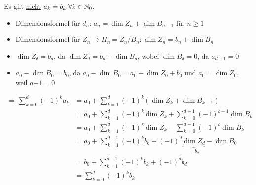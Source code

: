 \begin{bemerkung}
    Es gilt \underline{nicht} $a_k = b_k\;\forall k \in \mathbb{N}_0$.
\end{bemerkung}

\begin{beweis}\leavevmode
    \begin{itemize}
        \item Dimensionsformel für $d_n$: $a_n = \dim Z_n + \dim B_{n-1}$ für $n \geq 1$
        \item Dimensionsformel für $Z_n \rightarrow H_n = Z_n / B_n: \dim Z_n = b_n + \dim B_n$
        \item $\dim Z_d = b_d$, da $\dim Z_d = b_d + \dim B_d$, wobei $\dim B_d = 0$, da $a_{d+1} = 0$
        \item $a_0 - \dim B_0 = b_0$, da $a_0 - \dim B_0 = a_0 - \dim Z_0 + b_0$ und $a_0 = \dim Z_0$, weil
              $a{-1} = 0$
    \end{itemize}

    \begin{align*}
        \Rightarrow \sum_{k=0}^d (-1)^k a_k &= a_0 + \sum_{k=1}^d (-1)^k (\dim Z_k + \dim B_{k-1})\\
        &= a_0 + \sum_{k=1}^d (-1)^k \dim Z_k + \sum_{k=0}^{d-1} (-1)^{k+1}  \dim B_{k}\\
        &= a_0 + \sum_{k=1}^d (-1)^k \dim Z_k - \sum_{k=0}^{d-1} (-1)^k  \dim B_{k}\\
        &= a_0 + \sum_{k=1}^{d-1} (-1)^k b_k + (-1)^d  \underbrace{\dim Z_d}_{= b_d} - \dim B_0\\
        &= b_0 + \sum_{k=1}^{d-1} (-1)^k b_k + (-1)^d b_d\\
        &= \sum_{k=0}^d (-1)^k b_k
    \end{align*}
\end{beweis}





